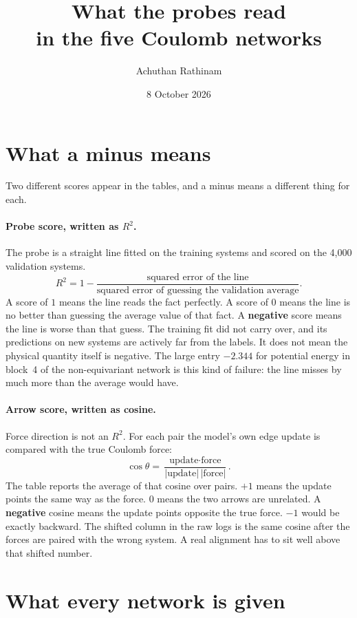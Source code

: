 \documentclass[11pt]{article}
\title{What the probes read\\in the five Coulomb networks}
\author{Achuthan Rathinam}
\date{8 October 2026}
\begin{document}
\maketitle

\section{What a minus means}

Two different scores appear in the tables, and a minus means a different thing for each.

\paragraph{Probe score, written as $R^2$.}
The probe is a straight line fitted on the training systems and scored on the 4{,}000 validation systems.
\[
R^2 = 1 - \frac{\text{squared error of the line}}{\text{squared error of guessing the validation average}}.
\]
A score of $1$ means the line reads the fact perfectly.
A score of $0$ means the line is no better than guessing the average value of that fact.
A \textbf{negative} score means the line is worse than that guess.
The training fit did not carry over, and its predictions on new systems are actively far from the labels.
It does not mean the physical quantity itself is negative.
The large entry $-2.344$ for potential energy in block~4 of the non-equivariant network is this kind of failure: the line misses by much more than the average would have.

\paragraph{Arrow score, written as cosine.}
Force direction is not an $R^2$.
For each pair the model's own edge update is compared with the true Coulomb force:
\[
\cos\theta = \frac{\text{update}\cdot\text{force}}{|\text{update}|\,|\text{force}|}.
\]
The table reports the average of that cosine over pairs.
$+1$ means the update points the same way as the force.
$0$ means the two arrows are unrelated.
A \textbf{negative} cosine means the update points opposite the true force.
$-1$ would be exactly backward.
The shifted column in the raw logs is the same cosine after the forces are paired with the wrong system.
A real alignment has to sit well above that shifted number.

\section{What every network is given}
\end{document}
